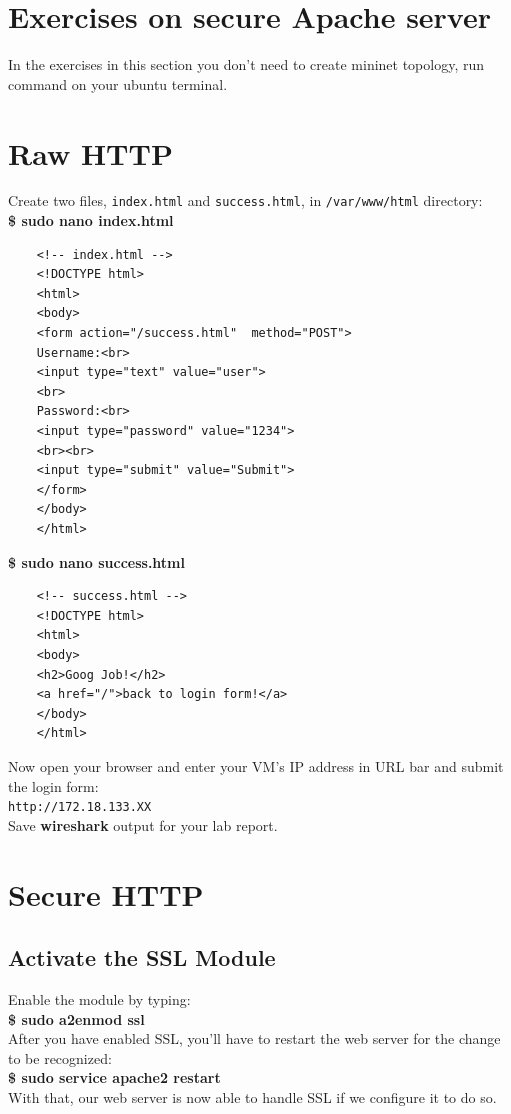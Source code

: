 \documentclass[10pt,a4paper]{article}
\numberwithin{equation}{section}
\numberwithin{figure}{section}
\numberwithin{table}{section}
\begin{document}
	\pagebreak
	
	\section*{Exercises on secure Apache server}
	In the exercises in this section you don't need to create mininet topology, run command on your ubuntu terminal.
	\section{Raw HTTP}
	Create two files, \texttt{index.html} and \texttt{success.html}, in \texttt{/var/www/html} directory: \\
	\textbf{\$ sudo nano index.html}
	\begin{verbatim}
	<!-- index.html --> 
	<!DOCTYPE html>
	<html>
	<body>
	<form action="/success.html"  method="POST">
	Username:<br>
	<input type="text" value="user">
	<br>
	Password:<br>
	<input type="password" value="1234">
	<br><br>
	<input type="submit" value="Submit">
	</form>
	</body>
	</html>
	\end{verbatim}
	\textbf{\$ sudo nano success.html}
	\begin{verbatim}
	<!-- success.html --> 
	<!DOCTYPE html>
	<html>
	<body>
	<h2>Goog Job!</h2>
	<a href="/">back to login form!</a>
	</body>
	</html>
	\end{verbatim}
	
	Now open your browser and enter your VM's IP address in URL bar and submit the login form:\\
	\texttt{http://172.18.133.XX} \\
	Save \textbf{wireshark} output for your lab report.
	\section{Secure HTTP}
	\subsection{Activate the SSL Module}
	Enable the module by typing: \\
	\textbf{\$ sudo a2enmod ssl} \\
	After you have enabled SSL, you'll have to restart the web server for the change to be recognized: \\
	\textbf{\$ sudo service apache2 restart} \\
	With that, our web server is now able to handle SSL if we configure it to do so. \\
\end{document}
